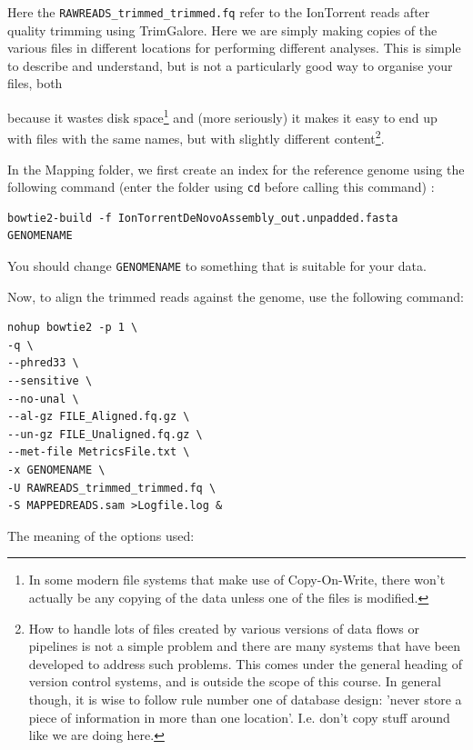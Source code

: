 \documentclass[11pt]{article}
\begin{document}
Here the \texttt{RAWREADS\_trimmed\_trimmed.fq} refer to the IonTorrent reads after
quality trimming using TrimGalore. Here we are simply making copies of the
various files in different locations for performing different analyses. This is simple to describe and
understand, but is not a particularly good way to organise your files, both

because it wastes disk space\footnote{In some modern file systems that make use of Copy-On-Write, there
won't actually be any copying of the data unless one of the files is modified.} and (more seriously) it makes it
easy to end up with files with the same names, but with slightly different
content\footnote{How to handle lots of files created by various versions of data
flows or pipelines is not a simple problem and there are many systems that
have been developed to address such problems. This comes under the general
heading of version control systems, and is outside the scope of this
course. In general though, it is wise to follow rule number one of database design:
'never store a piece of information in more than one location'. I.e. don't
copy stuff around like we are doing here.}.

In the Mapping folder, we first create an index for the reference genome using the
following command (enter the folder using \texttt{cd} before calling this command) :

\begin{verbatim}
bowtie2-build -f IonTorrentDeNovoAssembly_out.unpadded.fasta GENOMENAME
\end{verbatim}

You should change \texttt{GENOMENAME} to something that is suitable for your data.

Now, to align the trimmed reads against the genome, use the following command:

\begin{verbatim}
nohup bowtie2 -p 1 \
-q \
--phred33 \
--sensitive \
--no-unal \
--al-gz FILE_Aligned.fq.gz \
--un-gz FILE_Unaligned.fq.gz \
--met-file MetricsFile.txt \
-x GENOMENAME \
-U RAWREADS_trimmed_trimmed.fq \
-S MAPPEDREADS.sam >Logfile.log &
\end{verbatim}

The meaning of the options used:
\end{document}
